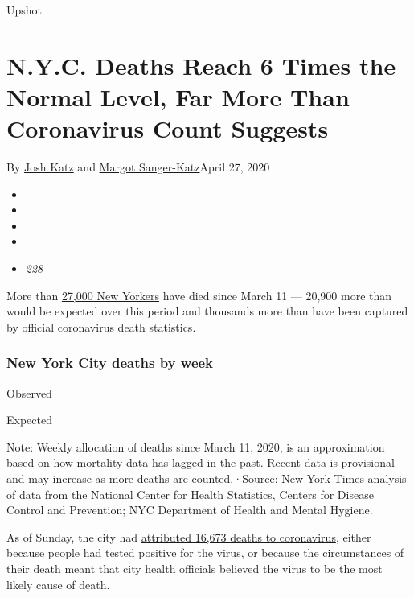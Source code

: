 Upshot

\hypertarget{nyc-deaths-reach-6-times-the-normal-level-far-more-than-coronavirus-count-suggests}{%
\section{N.Y.C. Deaths Reach 6 Times the Normal Level, Far More Than
Coronavirus Count
Suggests}\label{nyc-deaths-reach-6-times-the-normal-level-far-more-than-coronavirus-count-suggests}}

By \href{https://www.nytimes3xbfgragh.onion/by/josh-katz}{Josh Katz} and
\href{https://www.nytimes3xbfgragh.onion/by/margot-sanger-katz}{Margot
Sanger-Katz}April 27, 2020

\begin{itemize}
\item
\item
\item
\item
\item
  \emph{228}
\end{itemize}

More than
\href{https://www1.nyc.gov/assets/doh/downloads/pdf/imm/covid-19-deaths-confirmed-probable-daily-04262020.pdf}{27,000
New Yorkers} have died since March 11 --- 20,900 more than would be
expected over this period and thousands more than have been captured by
official coronavirus death statistics.

\hypertarget{new-york-city-deaths-by-week}{%
\subsubsection{\texorpdfstring{\textbf{New York City deaths by
week}}{New York City deaths by week}}\label{new-york-city-deaths-by-week}}

Observed

Expected

Note: Weekly allocation of deaths since March 11, 2020, is an
approximation based on how mortality data has lagged in the past. Recent
data is provisional and may increase as more deaths are counted.·Source:
New York Times analysis of data from the National Center for Health
Statistics, Centers for Disease Control and Prevention; NYC Department
of Health and Mental Hygiene.

As of Sunday, the city had
\href{https://www1.nyc.gov/assets/doh/downloads/pdf/imm/covid-19-deaths-confirmed-probable-daily-04262020.pdf}{attributed
16,673 deaths to coronavirus}, either because people had tested positive
for the virus, or because the circumstances of their death meant that
city health officials believed the virus to be the most likely cause of
death.

